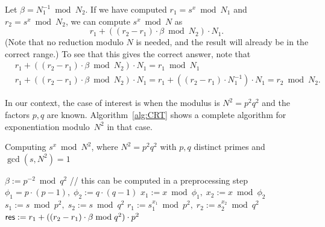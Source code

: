 \documentclass[11pt]{article}
\def\res{{\sf res}}
\newcommand{\?}[1]{\stackrel{?}{#1}}
\begin{document}
\medskip{}
Let $\beta=N_1^{-1} \bmod N_2$. %
If we have computed $r_1=s^x \bmod N_1$ and $r_2=s^x \bmod N_2$, we can compute $s^x \bmod N$ as
\[r_1+\left((r_2-r_1) \cdot \beta \bmod N_2\right) \cdot N_1 .\]
(Note that no reduction modulo $N$ is needed, and the result will already be in the correct range.)
To see that this gives the correct answer, note that 
\begin{eqnarray*}
& r_1+\left((r_2-r_1) \cdot \beta \bmod N_2\right) \cdot N_1 =  r_1 \bmod N_1 &\\
& r_1+\left((r_2-r_1) \cdot \beta \bmod N_2\right) \cdot N_1 = r_1+\left((r_2-r_1) \cdot N_1^{-1} \right) \cdot N_1 = r_2 \bmod N_2. &
\end{eqnarray*}


\medskip
In our context, the case of interest is when the modulus is $N^2=p^2 q^2$ and the factors $p, q$ are known.
Algorithm~\ref{alg:CRT} shows a complete algorithm for exponentiation modulo~$N^2$ in that case.

\begin{algorithm}
\caption{Computing $s^x \bmod N^2$, where $N^2=p^2q^2$ with $p, q$ distinct primes and $\gcd(s,N^2)=1$}\label{alg:CRT}
\begin{algorithmic}[1]
\State $\beta:=p^{-2} \bmod q^2$ \;\;\; //  this can be computed in a preprocessing step
\State $\phi_1 = p \cdot (p-1), \; \phi_2 := q \cdot (q-1)$
\State $x_1:= x \bmod \phi_1, \; x_2:=x \bmod \phi_2$
\State $s_1 := s \bmod p^2, \; s_2 := s \bmod q^2$
\State $r_1:= s_1^{x_1} \bmod p^2, \; 
r_2 := s_2^{x_2} \bmod q^2$
\State $\res := r_1+((r_2-r_1)\cdot \beta \bmod q^2) \cdot p^2$
\State \Return \res
\end{algorithmic}
\end{algorithm}
\end{document}
